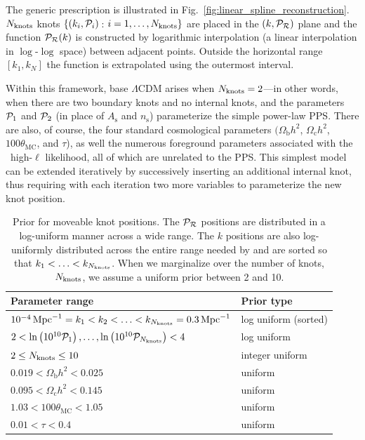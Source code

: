 The generic prescription is illustrated in Fig.~\ref{fig:linear_spline_reconstruction}. $N_\mathrm{knots}$ knots
$\{(k_i,\mathcal{P}_{i})\,$: $i=1,\ldots,N_\mathrm{knots}\}$ are placed in the $(k,\mathcal{P}_\mathcal{R})$ plane and the function $\mathcal{P}_\mathcal{R}(k)$ is
constructed by logarithmic interpolation (a linear interpolation in $\log$-$\log$ space) between adjacent points.
Outside the horizontal range $[k_1,k_N]$ the function is extrapolated using the outermost interval.

Within this framework, base $\Lambda$CDM arises when ${N_\mathrm{knots}=2}$---in other words, when there are two boundary knots
and no internal knots, and the parameters $\mathcal{P}_{1}$ and $\mathcal{P}_{2}$ (in place of $A_\mathrm{s}$ and $n_\mathrm{s}$) parameterize
the simple power-law PPS. There are also, of course,
the four standard cosmological parameters $(\Omega_{\mathrm{b}} h^2$, $\Omega_{\mathrm{c}} h^2$, $100\theta_{\mathrm{MC}}$, and 
$\tau$), as well the numerous foreground parameters associated with the \Planck\ high-$\ell$ likelihood, all of which are unrelated to the PPS.
This simplest model can be extended iteratively by successively inserting an additional internal knot, thus requiring with each iteration
two more variables to parameterize the new knot position.


\begin{table}
  \begin{tabular}{ll}
      Parameter range &
      Prior type
      \\
      \hline
      $10^{-4}\,\mathrm{Mpc}^{-1} = k_1< k_2 < \ldots < k_{N_\mathrm{knots}} = 0.3\,\mathrm{Mpc}^{-1}$ &
      log uniform (sorted)
      \\
      $ 2 < \ln\left(10^{10}\mathcal{P}_{1}\right), \ldots ,\ln\left(10^{10}\mathcal{P}_{{N_\mathrm{knots}}}\right) < 4 $  &
      log uniform
      \\
      $2\le N_\mathrm{knots} \le 10 $ &
      integer uniform
      \\
      \hline
      $0.019< \Omega_\mathrm{b} h^2 <0.025$ &
      uniform
      \\
      $0.095< \Omega_\mathrm{c} h^2 <0.145$ &
      uniform
      \\
      $1.03< 100\theta_\mathrm{MC} <1.05$ &
      uniform
      \\
      $0.01< \tau< 0.4$ &
      uniform
      \\
      \hline
    \end{tabular}
\caption{%
Prior for moveable knot positions.
The $\mathcal{P}_\mathcal{R}$ positions are distributed in a log-uniform manner across a wide range.
The $k$ positions are also log-uniformly distributed
across the entire range needed by \CosmoMC and are sorted so that ${k_1<\ldots<k_{N_\mathrm{knots}}}$. 
When we marginalize over the number of knots, $N_\mathrm{knots}$, we assume a uniform prior between 2 and 10. 
  \label{tab:P_k_priors}  }                          %
\end{table}                        %


